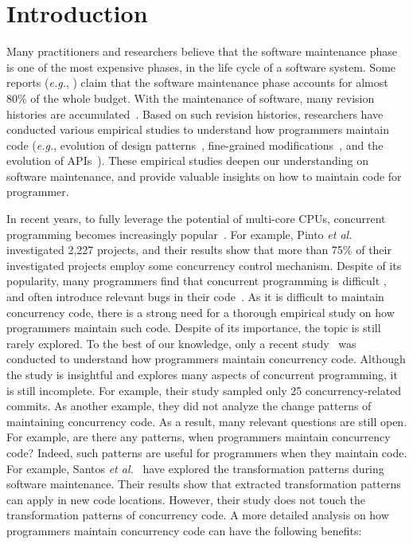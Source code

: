 \section{Introduction}
\label{sec:intro}
Many practitioners and researchers believe that the software maintenance phase is one of the most expensive phases, in the life cycle of a software system. Some reports (\emph{e.g.}, \cite{ahn2003software}) claim that the software maintenance phase accounts for almost 80\% of the whole budget. With the maintenance of software, many revision histories are accumulated~\cite{conf/icsm/Borges16}. Based on such revision histories, researchers have conducted various empirical studies to understand how programmers maintain code (\emph{e.g.}, evolution of design patterns~\cite{aversano2007empirical}, fine-grained modifications~\cite{german2006empirical}, and the evolution of APIs~\cite{mcdonnell2013empirical}). These empirical studies deepen our understanding on software maintenance, and provide valuable insights on how to maintain code for programmer.

In recent years, to fully leverage the potential of multi-core CPUs, concurrent programming becomes increasingly popular~\cite{journals/jss/PintoTFFB15}. For example, Pinto \emph{et al.}~\cite{journals/jss/PintoTFFB15} investigated 2,227 projects, and their results show that more than 75\% of their investigated projects employ some concurrency control mechanism. Despite of its popularity, many programmers find that concurrent programming is difficult \cite{journals/corr/McKenney17}, and often introduce relevant bugs in their code~\cite{conf/asplos/LuPSZ08}. As it is difficult to maintain concurrency code, there is a strong need for a thorough empirical study on how programmers maintain such code. Despite of its importance, the topic is still rarely explored. To the best of our knowledge, only a recent study~\cite{conf/sigsoft/GuJSZL15} was conducted to understand how programmers maintain concurrency code. Although the study is insightful and explores many aspects of concurrent programming, it is still incomplete. For example, their study sampled only 25 concurrency-related commits. As another example, they did not analyze the change patterns of maintaining concurrency code. As a result, many relevant questions are still open. For example, are there any patterns, when programmers maintain concurrency code? Indeed, such patterns are useful for programmers when they maintain code. For example, Santos \emph{et al.}~\cite{conf/icsm/SantosAEDV15} have explored the transformation patterns during software maintenance. Their results show that extracted transformation patterns can apply in new code locations. However, their study does not touch the transformation patterns of concurrency code. A more detailed analysis on how programmers maintain concurrency code can have the following benefits:





